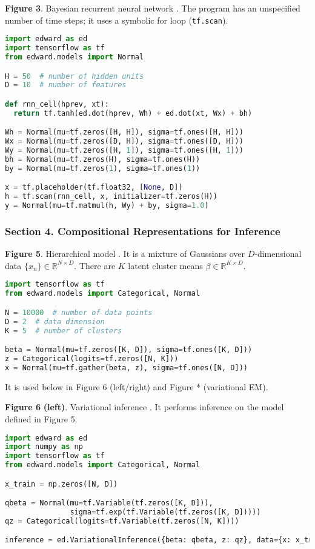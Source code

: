 \textbf{Figure 3}. Bayesian recurrent neural network \citep{neal2012bayesian}.
The program has an unspecified number of time steps; it uses a
symbolic for loop (\texttt{tf.scan}).
\begin{lstlisting}[language=python]
import edward as ed
import tensorflow as tf
from edward.models import Normal

H = 50  # number of hidden units
D = 10  # number of features

def rnn_cell(hprev, xt):
  return tf.tanh(ed.dot(hprev, Wh) + ed.dot(xt, Wx) + bh)

Wh = Normal(mu=tf.zeros([H, H]), sigma=tf.ones([H, H]))
Wx = Normal(mu=tf.zeros([D, H]), sigma=tf.ones([D, H]))
Wy = Normal(mu=tf.zeros([H, 1]), sigma=tf.ones([H, 1]))
bh = Normal(mu=tf.zeros(H), sigma=tf.ones(H))
by = Normal(mu=tf.zeros(1), sigma=tf.ones(1))

x = tf.placeholder(tf.float32, [None, D])
h = tf.scan(rnn_cell, x, initializer=tf.zeros(H))
y = Normal(mu=tf.matmul(h, Wy) + by, sigma=1.0)
\end{lstlisting}

\subsubsection{Section 4. Compositional Representations for Inference}

\textbf{Figure 5}. Hierarchical model \citep{gelman2006data}.
  It is a mixture of Gaussians over
  $D$-dimensional data $\{x_n\}\in\mathbb{R}^{N\times D}$. There are
  $K$ latent cluster means $\beta\in\mathbb{R}^{K\times D}$.
\begin{lstlisting}[language=python]
import tensorflow as tf
from edward.models import Categorical, Normal

N = 10000  # number of data points
D = 2  # data dimension
K = 5  # number of clusters

beta = Normal(mu=tf.zeros([K, D]), sigma=tf.ones([K, D]))
z = Categorical(logits=tf.zeros([N, K]))
x = Normal(mu=tf.gather(beta, z), sigma=tf.ones([N, D]))
\end{lstlisting}
It is used below in Figure 6 (left/right) and Figure * (variational EM).

\textbf{Figure 6} \textbf{(left)}. Variational inference
\citep{jordan1999introduction}.
It performs inference on the model defined in Figure 5.
\begin{lstlisting}[language=python]
import edward as ed
import numpy as np
import tensorflow as tf
from edward.models import Categorical, Normal

x_train = np.zeros([N, D])

qbeta = Normal(mu=tf.Variable(tf.zeros([K, D])),
               sigma=tf.exp(tf.Variable(tf.zeros([K, D]))))
qz = Categorical(logits=tf.Variable(tf.zeros([N, K])))

inference = ed.VariationalInference({beta: qbeta, z: qz}, data={x: x_train})
\end{lstlisting}

